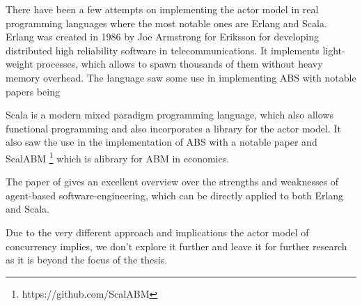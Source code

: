 There have been a few attempts on implementing the actor model in real programming languages where the most notable ones are Erlang and Scala. Erlang was created in 1986 by Joe Armstrong for Eriksson for developing distributed high reliability software in telecommunications. It implements light-weight processes, which allows to spawn thousands of them without heavy memory overhead. The language saw some use in implementing ABS with notable papers being \cite{di_stefano_using_2005, di_stefano_exat:_2007, varela_modelling_2004, sher_agent-based_2013, bezirgiannis_improving_2013}

Scala is a modern mixed paradigm programming language, which also allows functional programming and also incorporates a library for the actor model. It also saw the use in the implementation of ABS with a notable paper \cite{krzywicki_massively_2015} and ScalABM \footnote{https://github.com/ScalABM} which is alibrary for ABM in economics.

The paper of \cite{jennings_agent-based_2000} gives an excellent overview over the strengths and weaknesses of agent-based software-engineering, which can be directly applied to both Erlang and Scala.

Due to the very different approach and implications the actor model of concurrency implies, we don't explore it further and leave it for further research as it is beyond the focus of the thesis.